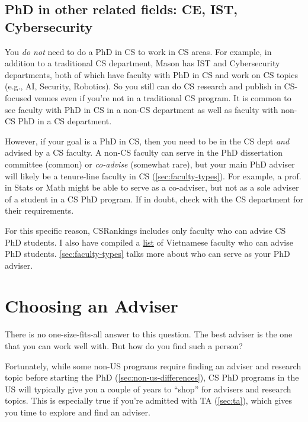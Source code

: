 \documentclass[oneside,11pt,dvipsnames]{book}
\def\sectioninfo#1{%
  \addcontentsline{toc}{sectioninfo}{%
    \noexpand\numberline{}\color{black}{#1}}%
}
\begin{document}
\subsection{PhD in other related fields: CE, IST, Cybersecurity}\label{sec:related-fields}

You \emph{do not} need to do a PhD in CS to work in CS areas. For example, in addition to a traditional CS department, Mason has IST and Cybersecurity departments, both of which have faculty with PhD in CS and work on CS topics (e.g., AI, Security, Robotics).  So you still can do CS research and publish in CS-focused venues even if you're not in a traditional CS program.  It is common to see faculty with PhD in CS in a non-CS department as well as faculty with non-CS PhD in a CS department.

However, if your goal is a PhD in CS, then you need to be in the CS dept \emph{and} advised by a CS faculty. A non-CS faculty can serve in the PhD dissertation committee (common) or \emph{co-advise} (somewhat rare), but your main PhD adviser will likely be a tenure-line faculty in CS (\autoref{sec:faculty-types}).
For example, a prof. in Stats or Math might be able to serve as a co-adviser, but not as a sole adviser of a student in a CS PhD program. 
If in doubt, check with the CS department for their requirements.

For this specific reason,  CSRankings includes only faculty who can advise CS PhD students. I also have compiled a \href{https://github.com/dynaroars/dynaroars.github.io/wiki/Viet-CS-Profs-US}{list} of Vietnamese faculty who can advise PhD students. \autoref{sec:faculty-types} talks more about who can serve as your PhD adviser.


\section{Choosing an Adviser}
\sectioninfo{The best adviser is the one that you can work well with. But you do not know that until you start working with them.}


There is no one-size-fits-all answer to this question. The best adviser is the one that you can work well with.  But how do you find such a person?

Fortunately, while some non-US programs require finding an adviser and research topic before starting the PhD (\autoref{sec:non-us-differences}), CS PhD programs in the US will typically give you a couple of years to ``shop'' for advisers and research topics.  This is especially true if you're admitted with TA (\autoref{sec:ta}), which gives you time to explore and find an adviser.
\end{document}
